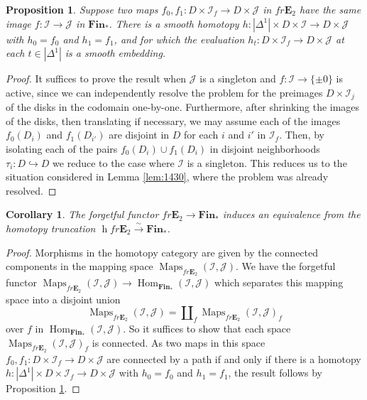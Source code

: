 \documentclass[reqno]{amsart}
\newtheorem{proposition}[lemma]{Proposition}
\newtheorem{corollary}[lemma]{Corollary}
\theoremstyle{definition}
\newcommand{\mcl}[1]{\mathcal{#1}}
\newcommand{\mbf}[1]{\mathbf{#1}}
\newcommand{\opn}[1]{\operatorname{#1}}
\newcommand{\E}{\mathbf{E}}
\DeclareMathOperator{\Hom}{Hom}
\DeclareMathOperator{\Maps}{Maps}
\renewcommand{\1}{\mathbf{1}}
\begin{document}
\begin{proposition}\label{prop:1456}
Suppose two maps $f_0,f_1:D\times\mcl{I}_{f}\to D\times \mcl{J}$ in $fr\E_2$ have the same image $f:\mcl{I}\to \mcl{J}$ in $\mbf{Fin}_{\ast}$. There is a smooth homotopy $h:|\Delta^1|\times D\times \mcl{I}\to D\times \mcl{J}$ with $h_0=f_0$ and $h_1=f_1$, and for which the evaluation $h_t:D\times \mcl{I}_{f}\to D\times\mcl{J}$ at each $t\in |\Delta^1|$ is a smooth embedding.
\end{proposition}

\begin{proof}
It suffices to prove the result when $\mcl{J}$ is a singleton and $f:\mcl{I}\to \{\pm 0\}$ is active, since we can independently resolve the problem for the preimages $D\times \mcl{I}_j$ of the disks in the codomain one-by-one.  Furthermore, after shrinking the images of the disks, then translating if necessary, we may assume each of the images $f_{0}(D_i)$ and $f_1(D_{i'})$ are disjoint in $D$ for each $i$ and $i'$ in $\mcl{I}_{f}$.  Then, by isolating each of the pairs $f_0(D_i)\cup f_1(D_i)$ in disjoint neighborhoods $\tau_i:D\hookrightarrow D$ we reduce to the case where $\mcl{I}$ is a singleton.  This reduces us to the situation considered in Lemma \ref{lem:1430}, where the problem was already resolved.
\end{proof}

\begin{corollary}\label{cor:h_e2}
The forgetful functor $fr\E_2\to \mbf{Fin}_{\ast}$ induces an equivalence from the homotopy truncation $\opn{h}fr\E_2\overset{\sim}\to \mbf{Fin}_{\ast}$.  
\end{corollary}

\begin{proof}
Morphisms in the homotopy category are given by the connected components in the mapping space $\Maps_{fr\E_2}(\mcl{I},\mcl{J})$.  We have the forgetful functor $\Maps_{fr\E_2}(\mcl{I},\mcl{J})\to \Hom_{\mbf{Fin}_{\ast}}(\mcl{I},\mcl{J})$ which separates this mapping space into a disjoint union
\[
\Maps_{fr\E_2}(\mcl{I},\mcl{J})=\amalg_{f}\Maps_{fr\E_2}(\mcl{I},\mcl{J})_{f}
\]
over $f$ in $\Hom_{\mbf{Fin}_{\ast}}(\mcl{I},\mcl{J})$.  So it suffices to show that each space $\Maps_{fr\E_2}(\mcl{I},\mcl{J})_{f}$ is connected.  As two maps in this space $f_0,f_1:D\times\mcl{I}_{f}\to D\times \mcl{J}$ are connected by a path if and only if there is a homotopy $h:|\Delta^1|\times D\times \mcl{I}_{f}\to D\times \mcl{J}$ with $h_0=f_0$ and $h_1=f_1$, the result follows by Proposition \ref{prop:1456}.
\end{proof}
\end{document}
